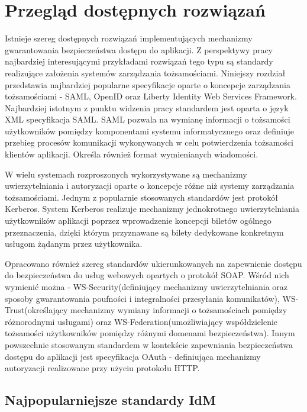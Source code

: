 \chapter{Przegląd dostępnych rozwiązań}
\label{cha:przegladRozwiazan}

{\it

	Istnieje szereg dostępnych rozwiązań implementujących mechanizmy gwarantowania bezpieczeństwa dostępu do aplikacji. Z perspektywy pracy najbardziej interesującymi przykładami rozwiązań tego typu są standardy realizujące założenia systemów zarządzania tożsamościami. Niniejszy rozdział przedstawia najbardziej popularne specyfikacje oparte o koncepcje zarządzania tożsamościami - SAML, OpenID oraz Liberty Identity Web Services Framework. Najbardziej istotnym z punktu widzenia pracy standardem jest oparta o język XML specyfikacja SAML. SAML pozwala na wymianę informacji o tożsamości użytkowników pomiędzy komponentami systemu informatycznego oraz definiuje przebieg procesów komunikacji wykonywanych w celu potwierdzenia tożsamości klientów aplikacji. Określa również format wymienianych wiadomości. 

	W wielu systemach rozproszonych wykorzystywane są mechanizmy uwierzytelniania i autoryzacji oparte o koncepcje różne niż systemy zarządzania tożsamościami. Jednym z popularnie stosowanych standardów jest protokół Kerberos. System Kerberos realizuje mechanizmy jednokrotnego uwierzytelniania użytkowników aplikacji poprzez wprowadzenie koncepcji biletów ogólnego przeznaczenia, dzięki którym przyznawane są bilety dedykowane konkretnym usługom żądanym przez użytkownika.

	Opracowano również szereg standardów ukierunkowanych na zapewnienie dostępu do bezpieczeństwa do usług webowych opartych o protokół SOAP. Wśród nich wymienić można - WS-Security(definiujący mechanizmy uwierzytelniania oraz sposoby gwarantowania poufności i integralności przesyłania komunikatów), WS-Trust(określający mechanizmy wymiany informacji o tożsamościach pomiędzy różnorodnymi usługami) oraz WS-Federation(umożliwiający współdzielenie tożsamości użytkowników pomiędzy różnymi domenami bezpieczeństwa). Innym powszechnie stosowanym standardem w kontekście zapewniania bezpieczeństwa dostępu do aplikacji jest specyfikacja OAuth - definiująca mechanizmy autoryzacji realizowane przy użyciu protokołu HTTP. 

}


\section{Najpopularniejsze standardy IdM}
\label{sec:standardyIdM}

